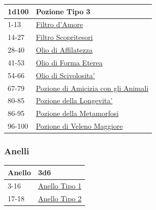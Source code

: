 \begin{multicols}{2}
{\medskip\hypertarget{Pozione Tipo 3}{}

{\small\begin{tabularx}{\linewidth}{ll}
		\toprule
\textbf{1d100} & \textbf{Pozione Tipo 3}\\
\toprule
1-13& \hyperlink{Filtro d'Amore}{Filtro d'Amore}\\
14-27 & \hyperlink{Filtro Scopritesori}{Filtro Scopritesori}\\
28-40 & \hyperlink{Olio di Affilatezza}{Olio di Affilatezza}\\
41-53 & \hyperlink{Olio di Forma Eterea}{Olio di Forma Eterea}\\
54-66 & \hyperlink{Olio di Scivolosita'}{Olio di Scivolosita'}\\
67-79 & \hyperlink{Pozione di Amicizia congli Animali}{Pozione di Amicizia con gli Animali}\\
80-85 & \hyperlink{Pozione della Longevita'}{Pozione della Longevita'}\\
86-95 & \hyperlink{Pozione della Metamorfosi}{Pozione della Metamorfosi}\\
96-100&\hyperlink{pozionifiltri}{Pozione di Veleno Maggiore}
\end{tabularx}}

\subsubsection{Anelli}\hypertarget{anellimagici}{}\label{anellimagici}

{\small\begin{tabularx}{\linewidth}{ll}
		\toprule
\textbf{Anello}&\textbf{3d6}\\
\toprule
3-16&\hyperlink{Pozione Tipo 3}{Anello Tipo 1} \\
17-18&\hyperlink{Pozione Tipo 3}{Anello Tipo 2}
\end{tabularx}}

\medskip\hypertarget{Anello Tipo 1}{}

}
\end{multicols}
